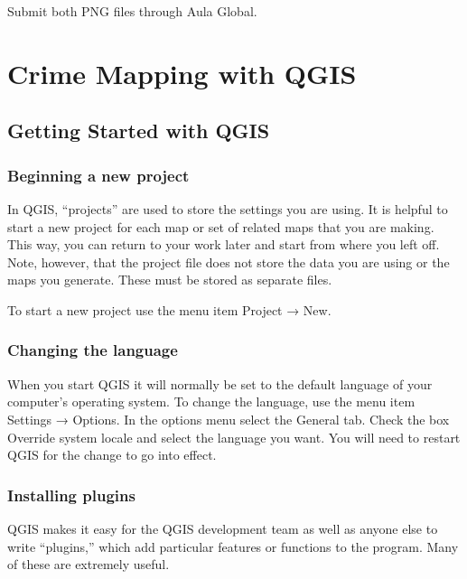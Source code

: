 \documentclass[]{book}
\begin{document}
Submit both PNG files through Aula Global.

\hypertarget{part-crime-mapping-with-qgis}{%
\part{Crime Mapping with QGIS}\label{part-crime-mapping-with-qgis}}

\hypertarget{getting-started-with-qgis}{%
\chapter{Getting Started with QGIS}\label{getting-started-with-qgis}}

\hypertarget{beginning-a-new-project}{%
\section{Beginning a new project}\label{beginning-a-new-project}}

In QGIS, ``projects'' are used to store the settings you are using. It is helpful to start a new project for each map or set of related maps that you are making. This way, you can return to your work later and start from where you left off. Note, however, that the project file does not store the data you are using or the maps you generate. These must be stored as separate files.

To start a new project use the menu item Project → New.

\hypertarget{changing-the-language}{%
\section{Changing the language}\label{changing-the-language}}

When you start QGIS it will normally be set to the default language of your computer's operating system. To change the language, use the menu item Settings → Options. In the options menu select the General tab. Check the box Override system locale and select the language you want. You will need to restart QGIS for the change to go into effect.

\hypertarget{installing-plugins}{%
\section{Installing plugins}\label{installing-plugins}}

QGIS makes it easy for the QGIS development team as well as anyone else to write ``plugins,'' which add particular features or functions to the program. Many of these are extremely useful.
\end{document}
